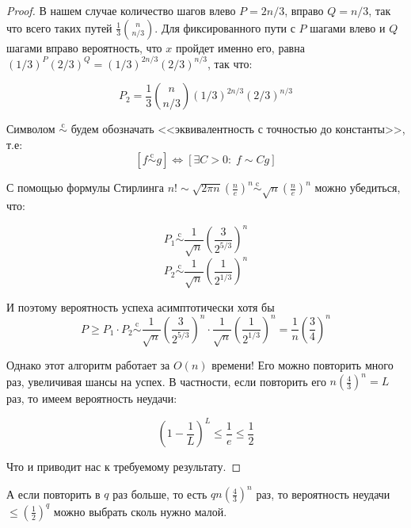 \begin{proof}
В нашем случае количество шагов влево $P = 2n/3$, вправо $Q=n/3$, так что всего таких путей $\frac{1}{3}{n\choose n/3}$. Для фиксированного пути с $P$ шагами влево и $Q$ шагами вправо вероятность, что $x$ пройдет именно его, равна $(1/3)^P (2/3)^Q = (1/3)^{2n/3} (2/3)^{n/3}$, так что:

$$P_2 = \frac{1}{3} {n\choose n/3} (1/3)^{2n/3} (2/3)^{n/3}$$

\newcommand{\scm}{\overset{\text{c}}{\sim}}
Символом $\scm$ будем обозначать <<эквивалентность с точностью до константы>>, т.е: $$[f \scm g] \iff [\exists C > 0: \; f \sim Cg]$$

С помощью формулы Стирлинга $n! \sim \sqrt{2\pi n}\left(\frac{n}{e}\right)^n \scm \sqrt{n}\left(\frac{n}{e}\right)^n$ можно убедиться, что:

$$ P_1 \scm \frac{1}{\sqrt n}\left(\frac{3}{2^{5/3}}\right)^n$$
$$ P_2 \scm \frac{1}{\sqrt n}\left(\frac{1}{2^{1/3}}\right)^n$$

И поэтому вероятность успеха асимптотически хотя бы
$$P \geq P_1 \cdot P_2 \scm \frac{1}{\sqrt n}\left(\frac{3}{2^{5/3}}\right)^n \cdot \frac{1}{\sqrt n}\left(\frac{1}{2^{1/3}}\right)^n = \frac{1}{n}\left(\frac{3}{4}\right)^n$$

Однако этот алгоритм работает за $O(n)$ времени! Его можно повторить много раз, увеличивая шансы на успех. В частности, если повторить его $n\left(\frac{4}{3}\right)^n = L$ раз, то имеем вероятность неудачи:

$$\left(1-\frac{1}{L}\right)^L \leq \frac{1}{e} \leq \frac{1}{2}$$

Что и приводит нас к требуемому результату.
\end{proof}

\begin{nb*}А если повторить в $q$ раз больше, то есть $qn\left(\frac{4}{3}\right)^n$ раз, то вероятность неудачи $\leq\left(\frac{1}{2}\right)^q$ можно выбрать сколь нужно малой.
\end{nb*}
